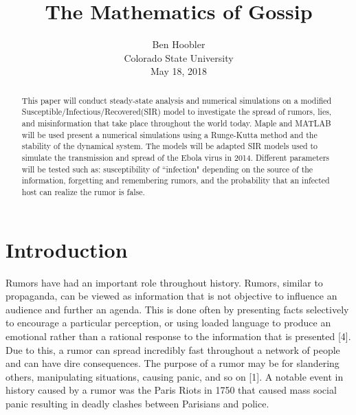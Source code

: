 \documentclass[11pt]{article}
\title{The Mathematics of Gossip}  %
\author{Ben Hoobler\\ \vspace{2mm} Colorado State University\\May 18, 2018}  %
\date{}  %
\begin{document}
\maketitle  %

\begin{abstract}  
This paper will conduct steady-state analysis and numerical simulations on a modified Susceptible/Infectious/Recovered(SIR) model to investigate the spread of rumors, lies, and misinformation that take place throughout the world today. Maple and MATLAB will be used present a numerical simulations using a Runge-Kutta method and the stability of the dynamical system. The models will be adapted SIR models used to simulate the transmission and spread of the Ebola virus in 2014. Different parameters will be tested such as: susceptibility of ``infection" depending on the source of the information, forgetting and remembering rumors, and the probability that an infected host can realize the rumor is false.
\end{abstract}


\section{Introduction} 
Rumors have had an important role throughout history. Rumors, similar to propaganda, can be viewed as information that is not objective to influence an audience and further an agenda. This is done often by presenting facts selectively to encourage a particular perception, or using loaded language to produce an emotional rather than a rational response to the information that is presented [4]. %
Due to this, a rumor can spread incredibly fast throughout a network of people and can have dire consequences. The purpose of a rumor may be for slandering others, manipulating situations, causing panic, and so on [1]. A notable event in history caused by a rumor was the Paris Riots in 1750 that caused mass social panic resulting in deadly clashes between Parisians and police.

\end{document}
